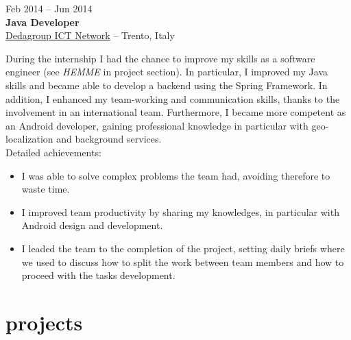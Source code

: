 \documentclass[]{friggeri-cv} %
\begin{document}
{Feb 2014 -- Jun 2014} \\
{\textbf{Java Developer}} \\
{\href{http://www.dedagroup.it}{Dedagroup ICT Network}} -- {Trento, Italy} \\
{During the internship I had the chance to improve my skills as a software engineer (see \textit{HEMME} in project section). In particular, I improved my Java skills and became able to develop a backend using the Spring Framework. In addition, I enhanced my team-working and communication skills, thanks to the involvement in an international team. Furthermore, I became more competent as an Android developer, gaining professional knowledge in particular with geo-localization and background services.
\\
Detailed achievements:
\begin{itemize}
\item I was able to solve complex problems the team had, avoiding therefore to waste time.
\item I improved team productivity by sharing my knowledges, in particular with Android design and development.
\item I leaded the team to the completion of the project, setting daily briefs where we used to discuss how to split the work between team members and how to proceed with the tasks development.
\end{itemize}}





\section{projects}
\end{document}
